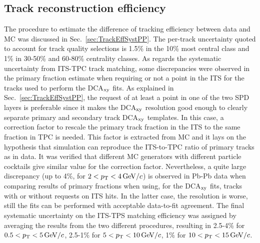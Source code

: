 \subsection{Track reconstruction efficiency}
\label{sec:TrackEffSystPbPb}
The procedure to estimate the difference
of tracking efficiency between data and MC was discussed in Sec.~\ref{sec:TrackEffSystPP}.
The per-track uncertainty quoted to account for track quality selections
is 1.5\% in the 10\% most central class and 1\% in 30-50\% and 60-80\% 
centrality classes. As regards the systematic uncertainty from ITS-TPC track
matching, some discrepancies were observed in the primary fraction estimate
when requiring or not a point in the ITS for the tracks used to perform the DCA$_{\rm xy}$ fits.
As explained in Sec.~\ref{sec:TrackEffSystPP}, the request of at least a point
in one of the two SPD layers is preferable since it makes the DCA$_{\rm xy}$
resolution good enough to clearly separate primary and secondary track DCA$_{\rm xy}$ templates.
In this case, a correction factor to rescale the primary track fraction in the ITS
to the same fraction in TPC is needed. This factor is extracted from MC and it
lays on the hypothesis that simulation can reproduce the ITS-to-TPC ratio of primary tracks 
as in data. It was verified that different MC generators with different particle
cocktails give similar value for the correction factor. Nevertheless, a quite large discrepancy
(up to 4\%, for $2 < p_{\rm T} < 4\, \mathrm{GeV}/c$) is observed in Pb-Pb data when 
comparing results of primary fractions when using, for the DCA$_{\rm xy}$ fits, tracks
with or without requests on ITS hits. In the latter case, the 
resolution is worse, still the fits can be performed with acceptable data-to-fit agreement.
The final systematic uncertainty on the ITS-TPS matching efficiency was
assigned by averaging the results from the two different procedures, resulting in
2.5-4\% for $0.5 < p_{\rm T} < 5 \, \mathrm{GeV}/c$, 2.5-1\% for $5 < p_{\rm T} < 10 \, \mathrm{GeV}/c$, 1\% for $10 < p_{\rm T} < 15\, \mathrm{GeV}/c$.


